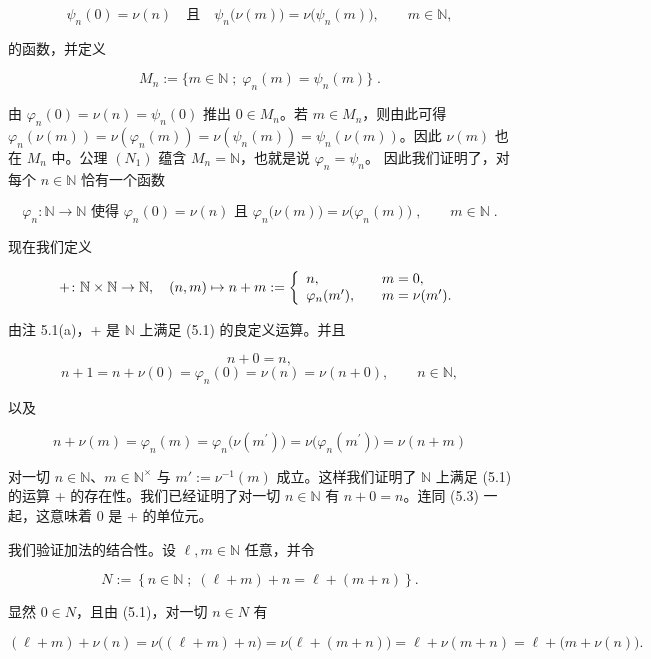 \begin{theorem}
\begin{items}
\[
\psi_{n}(0)=\nu(n)\quad\text{且}\quad\psi_{n}\bigl(\nu(m)\bigr)=\nu\bigl(\psi_{n}(m)\bigr),\qquad m\in\mathbb{N},
\]

的函数，并定义

\[
M_{n}:=\bigl\{m\in\mathbb{N}\;;\;\varphi_{n}(m)=\psi_{n}(m)\bigr\}\;.
\]

由 $\varphi_n(0) = \nu(n) = \psi_n(0)$ 推出 $0 \in M_n$。若 $m \in M_n$，则由此可得 $\varphi_n(\nu(m)) = \nu(\varphi_n(m)) = \nu(\psi_n(m)) = \psi_n(\nu(m))$。因此 $\nu(m)$ 也在 $M_n$ 中。公理 $(N_1)$ 蕴含 $M_n = \mathbb{N}$，也就是说 $\varphi_n = \psi_n$。
因此我们证明了，对每个 $ n \in \mathbb{N} $ 恰有一个函数

\[
\varphi_{n}\colon\mathbb{N}\to\mathbb{N}\text{ 使得 }\varphi_{n}(0)=\nu(n)\text{ 且 }\varphi_{n}\bigl(\nu(m)\bigr)=\nu\bigl(\varphi_{n}(m)\bigr)\;,\qquad m\in\mathbb{N}\;.
\]

现在我们定义

\begin{equation}
+\colon\mathbb{N}\times\mathbb{N}\to\mathbb{N},\quad(n,m)\mapsto n+m:=\left\{\begin{array}{l l}{n,}&{\quad m=0,}\\ {\varphi_{n}(m^{\prime}),}&{\quad m=\nu(m^{\prime}).}\end{array}\right.
\end{equation}

由注 5.1(a)，+ 是 $ \mathbb{N} $ 上满足 (5.1) 的良定义运算。并且

\[
n+0=n,
\]
\[
n+1=n+\nu(0)=\varphi_{n}(0)=\nu(n)=\nu(n+0),\qquad n\in\mathbb{N},
\]

以及

\[
n+\nu(m)=\varphi_{n}(m)=\varphi_{n}\big(\nu(m^{\prime})\big)=\nu\big(\varphi_{n}(m^{\prime})\big)=\nu(n+m)
\]

对一切 $ n \in \mathbb{N} $、$ m \in \mathbb{N}^\times $ 与 $ m' := \nu^{-1}(m) $ 成立。这样我们证明了 $ \mathbb{N} $ 上满足 (5.1) 的运算 + 的存在性。我们已经证明了对一切 $ n \in \mathbb{N} $ 有 $ n + 0 = n $。连同 (5.3) 一起，这意味着 0 是 + 的单位元。

\item

我们验证加法的结合性。设 $ \ell, m \in \mathbb{N} $ 任意，并令

\[
N:=\left\{n\in\mathbb{N}\;;\;\left(\ell+m\right)+n=\ell+(m+n)\right\}.
\]

显然 $ 0 \in N $，且由 (5.1)，对一切 $ n \in N $ 有

\[
(\ell+m)+\nu(n)=\nu\big((\ell+m)+n\big)=\nu\big(\ell+(m+n)\big)=\ell+\nu(m+n)=\ell+\big(m+\nu(n)\big).
\]


\end{items}
\end{theorem}
